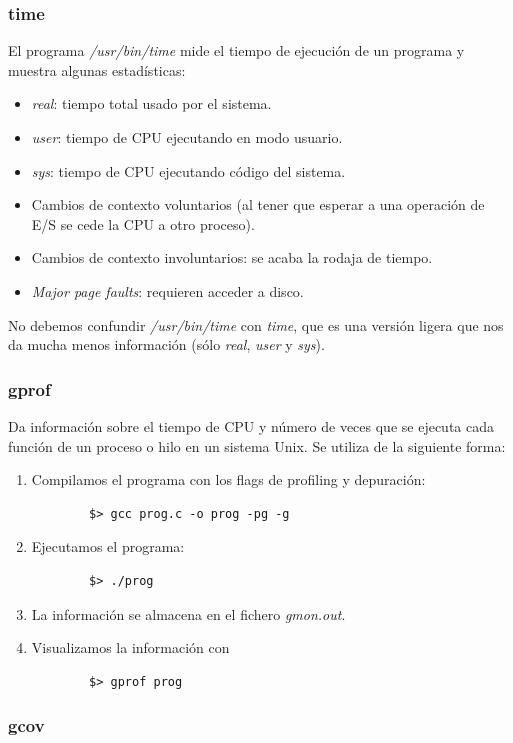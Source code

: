 \documentclass[12pt,spanish]{article}
\begin{document}
\subsubsection{time}
El programa \textit{/usr/bin/time} mide el tiempo de ejecución de un programa y muestra algunas estadísticas:
\begin{itemize}
	\item \textit{real}: tiempo total usado por el sistema.
	\item \textit{user}: tiempo de CPU ejecutando en modo usuario.
	\item \textit{sys}: tiempo de CPU ejecutando código del sistema.
	\item Cambios de contexto voluntarios (al tener que esperar a una operación de E/S se cede la CPU a otro proceso).
	\item Cambios de contexto involuntarios: se acaba la rodaja de tiempo.
	\item \textit{Major page faults}: requieren acceder a disco.
\end{itemize}
No debemos confundir \textit{/usr/bin/time} con \textit{time}, que es una versión ligera que nos da mucha menos información (sólo \textit{real}, \textit{user} y \textit{sys}).

\subsubsection{gprof}
Da información sobre el tiempo de CPU y número de veces que se ejecuta cada función de un proceso o hilo en un sistema Unix. Se utiliza de la siguiente forma:
\begin{enumerate}
	\item Compilamos el programa con los flags de profiling y depuración:
	\begin{lstlisting}
		$> gcc prog.c -o prog -pg -g
	\end{lstlisting}
	\item Ejecutamos el programa:
	\begin{lstlisting}
		$> ./prog
	\end{lstlisting}
	\item La información se almacena en el fichero \textit{gmon.out}.
	\item Visualizamos la información con
	\begin{lstlisting}
		$> gprof prog
	\end{lstlisting}
\end{enumerate}

\subsubsection{gcov}
\end{document}
